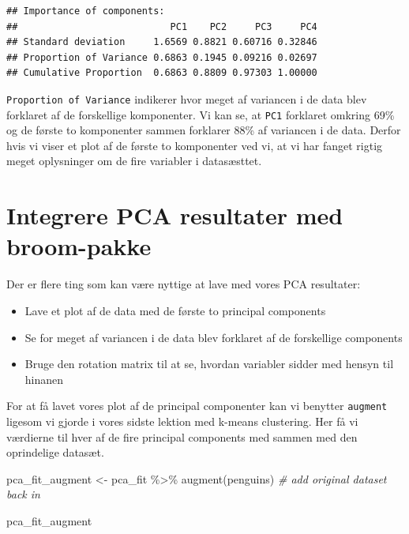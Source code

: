\documentclass[
]{book}
\newenvironment{Shaded}{\begin{snugshade}}{\end{snugshade}}
\newcommand{\CommentTok}[1]{\textcolor[rgb]{0.56,0.35,0.01}{\textit{#1}}}
\newcommand{\FunctionTok}[1]{\textcolor[rgb]{0.00,0.00,0.00}{#1}}
\newcommand{\NormalTok}[1]{#1}
\newcommand{\OtherTok}[1]{\textcolor[rgb]{0.56,0.35,0.01}{#1}}
\newcommand{\SpecialCharTok}[1]{\textcolor[rgb]{0.00,0.00,0.00}{#1}}
\providecommand{\tightlist}{%
  \setlength{\itemsep}{0pt}\setlength{\parskip}{0pt}}
\begin{document}
\begin{verbatim}
## Importance of components:
##                           PC1    PC2     PC3     PC4
## Standard deviation     1.6569 0.8821 0.60716 0.32846
## Proportion of Variance 0.6863 0.1945 0.09216 0.02697
## Cumulative Proportion  0.6863 0.8809 0.97303 1.00000
\end{verbatim}

\texttt{Proportion\ of\ Variance} indikerer hvor meget af variancen i de data blev forklaret af de forskellige komponenter. Vi kan se, at \texttt{PC1} forklaret omkring 69\% og de første to komponenter sammen forklarer 88\% af variancen i de data. Derfor hvis vi viser et plot af de første to komponenter ved vi, at vi har fanget rigtig meget oplysninger om de fire variabler i datasæsttet.

\hypertarget{integrere-pca-resultater-med-broom-pakke}{%
\section{Integrere PCA resultater med broom-pakke}\label{integrere-pca-resultater-med-broom-pakke}}

Der er flere ting som kan være nyttige at lave med vores PCA resultater:

\begin{itemize}
\tightlist
\item
  Lave et plot af de data med de første to principal components
\item
  Se for meget af variancen i de data blev forklaret af de forskellige components
\item
  Bruge den rotation matrix til at se, hvordan variabler sidder med hensyn til hinanen
\end{itemize}

For at få lavet vores plot af de principal componenter kan vi benytter \texttt{augment} ligesom vi gjorde i vores sidste lektion med k-means clustering. Her få vi værdierne til hver af de fire principal components med sammen med den oprindelige datasæt.

\begin{Shaded}
\begin{Highlighting}[]
\NormalTok{pca\_fit\_augment }\OtherTok{\textless{}{-}}\NormalTok{ pca\_fit }\SpecialCharTok{\%\textgreater{}\%} 
  \FunctionTok{augment}\NormalTok{(penguins) }\CommentTok{\# add original dataset back in}

\NormalTok{pca\_fit\_augment}
\end{Highlighting}
\end{Shaded}
\end{document}
